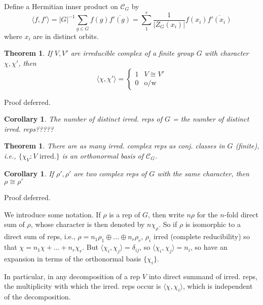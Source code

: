 \documentclass{article}
\theoremstyle{definition}
\theoremstyle{remark}
\theoremstyle{plain}
\newtheorem{thm}[defn]{Theorem}
\newtheorem{crly}[defn]{Corollary}
\begin{document}
Define a Hermitian inner product on $\mathcal{C}_G$ by
\[\langle f,f'\rangle=|G|^{-1}\sum_{g\in G}f(g)\overline{f'(g)}=\sum_{1}^r\dfrac{1}{|Z_G(x_i)|}f(x_i)\overline{f'(x_i)}\]
where $x_i$ are in distinct orbits.
\begin{thm}
    If $V,V'$ are irreducible complex of a finite group $G$ with character $\chi,\chi'$, then
    \[\langle\chi,\chi'\rangle=\begin{cases}
        1 & V\cong V'\\
        0 & \text{o/w}
    \end{cases}\]
\end{thm}
Proof deferred.
\begin{crly}
    The number of distinct irred. reps of $G$ = the number of distinct irred. reps?????
\end{crly}
\begin{thm}
    There are as many irred. complex reps as conj. classes in $G$ (finite), i.e., $\{\chi_V: V\text{ irred.}\}$ is an orthonormal basis of $\mathcal{C}_G$.
\end{thm}

\begin{crly}
    If $\rho',\rho'$ are two complex reps of $G$ with the same character, then $\rho\cong\rho'$
\end{crly}
Proof deferred.


We introduce some notation. If $\rho$ is a rep of $G$, then write $n\rho$ for the $n$-fold direct sum of $\rho$, whose character is then denoted by $n\chi_\rho$. So if $\rho$ is isomorphic to a direct sum of reps, i.e., $\rho=n_1\rho_1\oplus...\oplus n_r\rho_r$, $\rho_i$ irred (complete reducibility) so that $\chi=n_1\chi+...+n_r\chi_r$. But $\langle\chi_i,\chi_j\rangle=\delta_{ij}$, so $\langle\chi_i,\chi_j\rangle=n_i$, so have an expansion in terms of the orthonormal basis $\{\chi_i\}$.

In particular, in any decomposition of a rep $V$ into direct summand of irred. reps, the multiplicity with which the irred. reps occur is $\langle\chi,\chi_i\rangle$, which is independent of the decomposition.
\end{document}
